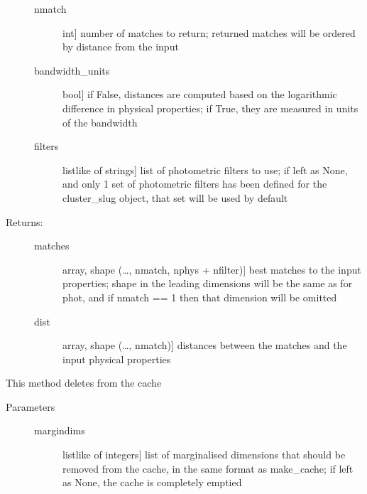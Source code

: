 \documentclass[letterpaper,10pt,english]{sphinxmanual}
\begin{document}
\begin{fulllineitems}
\begin{fulllineitems}
\begin{description}
\begin{description}
\item[{nmatch}] \leavevmode{[}int{]}
number of matches to return; returned matches will be
ordered by distance from the input

\item[{bandwidth\_units}] \leavevmode{[}bool{]}
if False, distances are computed based on the
logarithmic difference in physical properties; if True,
they are measured in units of the bandwidth

\item[{filters}] \leavevmode{[}listlike of strings{]}
list of photometric filters to use; if left as None, and
only 1 set of photometric filters has been defined for
the cluster\_slug object, that set will be used by
default

\end{description}

\item[{Returns:}] \leavevmode\begin{description}
\item[{matches}] \leavevmode{[}array, shape (…, nmatch, nphys + nfilter){]}
best matches to the input properties; shape in the
leading dimensions will be the same as for phot, and if
nmatch == 1 then that dimension will be omitted

\item[{dist}] \leavevmode{[}array, shape (…, nmatch){]}
distances between the matches and the input physical
properties

\end{description}

\end{description}

\end{fulllineitems}


\begin{fulllineitems}
\label{\detokenize{cluster_slug:slugpy.cluster_slug.cluster_slug.clear_cache}}
This method deletes from the cache
\begin{description}
\item[{Parameters}] \leavevmode\begin{description}
\item[{margindims}] \leavevmode{[}listlike of integers{]}
list of marginalised dimensions that should be removed
from the cache, in the same format as make\_cache; if
left as None, the cache is completely emptied


\end{description}
\end{description}
\end{fulllineitems}
\end{fulllineitems}
\end{document}
